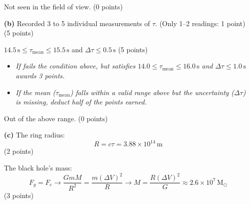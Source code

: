 Not seen in the field of view. \hfill(0 points)

\textbf{(b)} Recorded 3 to 5 individual measurements of $\tau$. (Only 1--2
readings: 1 point) \hfill(5 points)

$14.5\,\mathrm{s} \le \tau_{\mathrm{mean}} \le 15.5\,\mathrm{s}$ and
$\Delta\tau \le 0.5\,\mathrm{s}$ \hfill(5 points)
\begin{itemize}
\item \textit{If fails the condition above, but satisfies
  $14.0 \le \tau_{\mathrm{mean}} \le 16.0\,\mathrm{s}$ and
  $\Delta\tau \le 1.0\,\mathrm{s}$ awards 3 points.}
\item \textit{If the mean ($\tau_{\mathrm{mean}}$) falls within a valid range
  above but the uncertainty ($\Delta\tau$) is missing, deduct half of the
  points earned.}
\end{itemize}

Out of the above range. \hfill(0 points)

\textbf{(c)} The ring radius:
\[ R = c\tau = 3.88 \times 10^{14}\,\mathrm{m} \]
\hfill(2 points)

The black hole's mass:
\[ F_g = F_c \rightarrow \frac{GmM}{R^2} = \frac{m(\Delta V)^2}{R}
   \rightarrow M = \frac{R(\Delta V)^2}{G} \approx 2.6 \times 10^{7}\,\mathrm{M}_\odot \]
\hfill(3 points)
